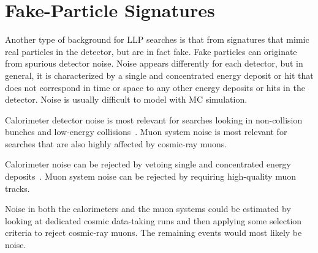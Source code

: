 
\section{Fake-Particle Signatures} %

Another type of background for LLP searches is that from signatures that mimic real particles in the detector, but are in fact fake. Fake particles can originate from spurious detector noise. Noise appears differently for each detector, but in general, it is characterized by a single and concentrated energy deposit or hit that does not correspond in time or space to any other energy deposits or hits in the detector. Noise is usually difficult to model with MC simulation.

Calorimeter detector noise is most relevant for searches looking in non-collision bunches and low-energy collisions~\cite{Khachatryan:2015jha, Chatrchyan:2012dxa, Khachatryan:2010uf}. Muon system noise is most relevant for searches that are also highly affected by cosmic-ray muons.

Calorimeter noise can be rejected by vetoing single and concentrated energy deposits~\cite{Khachatryan:2015jha, Chatrchyan:2012dxa, Khachatryan:2010uf}. Muon system noise can be rejected by requiring high-quality muon tracks.

Noise in both the calorimeters and the muon systems could be estimated by looking at dedicated cosmic data-taking runs and then applying some selection criteria to reject cosmic-ray muons. The remaining events would most likely be noise.

